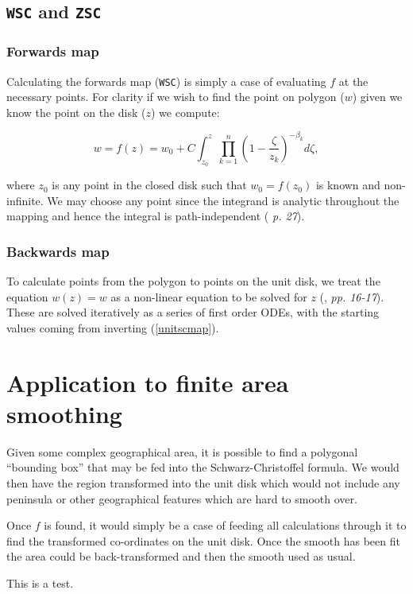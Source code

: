 \documentclass[a4paper,10pt]{amsart}
\newcommand{\sch}{Schwarz-Christoffel }
\begin{document}
\subsection{\texttt{WSC} and \texttt{ZSC}}

\subsubsection{Forwards map}

Calculating the forwards map (\texttt{WSC}) is simply a case of evaluating $f$ at the necessary points. For clarity if we wish to find the point on polygon ($w$) given we know the point on the disk ($z$) we compute:

\begin{equation}
\label{unitscmap}
w=f(z) = w_0 + C \int_{z_0}^{z} \prod_{k=1}^{n} (1 - \frac{\zeta}{z_k})^{-\beta_k} d\zeta,
\end{equation}

where $z_0$ is any point in the closed disk such that $w_0 = f(z_0)$ is known and non-infinite. We may choose any point since the integrand is analytic throughout the mapping and hence the integral is path-independent (\cite{driscoll} \emph{p. 27}).


\subsubsection{Backwards map}

To calculate points from the polygon to points on the unit disk, we treat the equation $w(z)=w$ as a non-linear equation to be solved for $z$ (\cite{trefethen}, \emph{pp. 16-17}). These are solved iteratively as a series of first order ODEs, with the starting values coming from inverting (\ref{unitscmap}).



\section{Application to finite area smoothing}

Given some complex geographical area, it is possible to find a polygonal ``bounding box'' that may be fed into the \sch formula. We would then have the region transformed into the  unit disk which would not include any peninsula or other geographical features which are hard to smooth over.

Once $f$ is found, it would simply be a case of feeding all calculations through it to find the transformed co-ordinates on the unit disk. Once the smooth has been fit the area could be back-transformed and then the smooth used as usual.

This is a test.







\end{document}
